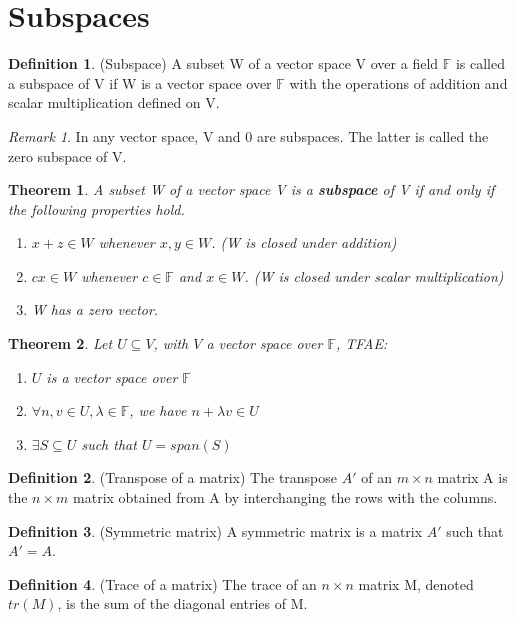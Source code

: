 \documentclass[12pt]{article}
\newtheorem{theorem}{Theorem}[section]
\theoremstyle{definition}
\newtheorem{definition}{Definition}[section]
\theoremstyle{remark}
\newtheorem*{remark}{Remark}
\begin{document}
\section{Subspaces}
    \begin{definition}(Subspace)
        A subset W of a vector space V over a field $\mathbb{F}$ is called a subspace of V if W is a vector 
        space over $\mathbb{F}$ with the operations of addition and scalar multiplication defined on V.
        
    \end{definition}
    \begin{remark}
        In any vector space, V and {0} are subspaces. The latter is called the zero subspace of V.
    \end{remark}
    \begin{theorem}
        A subset W of a vector space V is a \textbf{subspace} of V if and only if the following
        properties hold.
        \begin{enumerate}
            \item $x+z \in W$ whenever $x,y \in W$. (W is closed under addition)
            \item $cx \in W$ whenever $c \in \mathbb{F}$ and $x \in W$. (W is closed under scalar multiplication)
            \item W has a zero vector.
        \end{enumerate}
    \end{theorem}
    \begin{theorem}
        Let $U\subseteq V$, with $V$ a vector space over $\mathbb{F}$, TFAE:
        \begin{enumerate}
            \item $U$ is a vector space over $\mathbb{F}$
            \item $\forall n,v \in U, \lambda \in \mathbb{F}$, we have $n+\lambda v \in U$
            \item $\exists S \subseteq U$ such that $U=span(S)$
        \end{enumerate}
    \end{theorem}
    \begin{definition}(Transpose of a matrix)
        The transpose $A'$ of an $m \times n$ matrix A is the $n \times m$ matrix obtained 
        from A by interchanging the rows with the columns.
    \end{definition}
    \begin{definition}(Symmetric matrix)
        A symmetric matrix is a matrix $A'$ such that $A' = A$.
    \end{definition}
    \begin{definition}(Trace of a matrix)
        The trace of an $n \times n$ matrix M, denoted $tr(M)$, is the sum of the diagonal entries of M.
    \end{definition}
\end{document}
